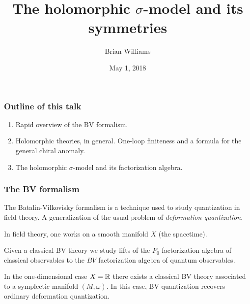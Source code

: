 \documentclass[10pt]{beamer}
\title{The holomorphic $\sigma$-model and its symmetries}
\author{Brian Williams}
\institute{Northwestern University \\ Advisors: John Francis and Kevin Costello}
\date{May 1, 2018}
\begin{document}
\frame{\titlepage}

\begin{frame}
\frametitle{Outline of this talk}
\begin{enumerate}
\item Rapid overview of the BV formalism.
\item Holomorphic theories, in general. 
One-loop finiteness and a formula for the general chiral anomaly. 
\item The holomorphic $\sigma$-model and its factorization algebra.
\end{enumerate}
\end{frame}

\begin{frame}[fragile]
\frametitle{The BV formalism}
The Batalin-Vilkovisky formalism is a technique used to study quantization in field theory.
A generalization of the usual problem of {\em deformation quantization}.
\ben
{}
\een

In field theory, one works on a smooth manifold $X$ (the spacetime). 
\ben
{}
\een
Given a classical BV theory we study lifts of the $P_0$ factorization algebra of classical observables to the $BV$ factorization algebra of quantum observables.

In the one-dimensional case $X = \mathbb R$ there exists a classical BV theory associated to a symplectic manifold $(M, \omega)$. 
In this case, BV quantization recovers ordinary deformation quantization. 
\end{frame}
\end{document}
